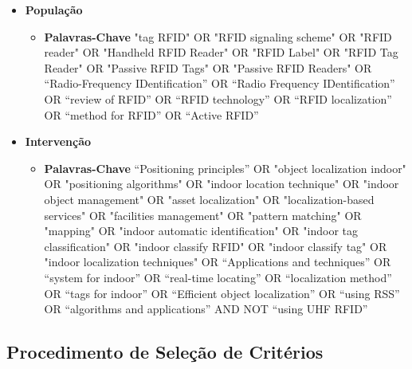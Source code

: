            \begin{itemize}
            \item \textbf{População}
            	\begin{itemize}
            		\item \textbf{Palavras-Chave} "tag RFID"  OR  "RFID signaling scheme"  OR  "RFID reader"  OR  "Handheld RFID Reader"  OR  "RFID Label"  OR  "RFID Tag Reader"  OR  "Passive RFID Tags"  OR  "Passive RFID Readers" OR “Radio-Frequency IDentification” OR “Radio Frequency IDentification”  OR “review of RFID” OR “RFID  technology” OR “RFID localization” OR “method for RFID” OR “Active RFID”
            	\end{itemize}
            \item \textbf{Intervenção } 
            	\begin{itemize}
            
             \item \textbf{Palavras-Chave} “Positioning principles” OR "object localization indoor"  OR  "positioning algorithms"  OR  "indoor location technique"  OR  "indoor object management"  OR  "asset localization"  OR  "localization-based services"  OR  "facilities management"  OR  "pattern matching"  OR  "mapping"  OR  "indoor automatic identification"  OR  "indoor tag classification"  OR  "indoor classify RFID"  OR  "indoor classify tag"  OR  "indoor localization techniques" OR “Applications and techniques” OR “system for indoor” OR “real-time locating” OR “localization method” OR “tags for indoor” OR “Efficient object localization” OR “using RSS” OR “algorithms and applications” AND NOT “using UHF RFID”
           		\end{itemize}
            \end{itemize}
             
            
	\subsection{Procedimento de Seleção de Critérios}

